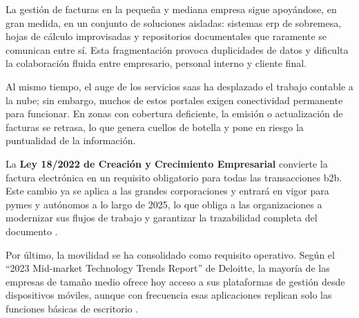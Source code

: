 \begin{large}
La gestión de facturas en la pequeña y mediana empresa sigue apoyándose, en gran medida, en un conjunto de soluciones aisladas: sistemas \gls{erp} de sobremesa, hojas de cálculo improvisadas y repositorios documentales que raramente se comunican entre sí. Esta fragmentación provoca duplicidades de datos y dificulta la colaboración fluida entre empresario, personal interno y cliente final.

Al mismo tiempo, el auge de los servicios \gls{saas} ha desplazado el trabajo contable a la nube; sin embargo, muchos de estos portales exigen conectividad permanente para funcionar. En zonas con cobertura deficiente, la emisión o actualización de facturas se retrasa, lo que genera cuellos de botella y pone en riesgo la puntualidad de la información.

La \textbf{Ley 18/2022 de Creación y Crecimiento Empresarial} convierte la factura electrónica en un requisito obligatorio para todas las transacciones \gls{b2b}. Este cambio ya se aplica a las grandes corporaciones y entrará en vigor para pymes y autónomos a lo largo de 2025, lo que obliga a las organizaciones a modernizar sus flujos de trabajo y garantizar la trazabilidad completa del documento \cite{ley18_2022}.

Por último, la movilidad se ha consolidado como requisito operativo. Según el “2023 Mid-market Technology Trends Report” de Deloitte, la mayoría de las empresas de tamaño medio ofrece hoy acceso a sus plataformas de gestión desde dispositivos móviles, aunque con frecuencia esas aplicaciones replican solo las funciones básicas de escritorio \cite{estudio_movilidad}.
\end{large}

